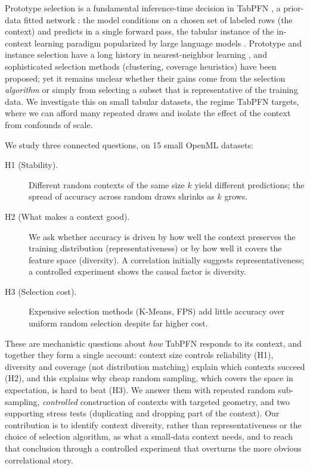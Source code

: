 \documentclass[11pt,a4paper]{article}
\begin{document}
Prototype selection is a fundamental inference-time decision in TabPFN
\cite{hollmann2025tabpfn}, a prior-data fitted network \cite{muller2022pfn}: the
model conditions on a chosen set of labeled rows (the context) and predicts in a
single forward pass, the tabular instance of the in-context learning paradigm
popularized by large language models \cite{brown2020gpt3, dong2024icl}. Prototype and instance selection have a long
history in nearest-neighbor learning \cite{garcia2012prototype}, and
sophisticated selection methods (clustering, coverage heuristics) have been
proposed; yet it remains unclear whether their gains come from the selection
\emph{algorithm} or simply from selecting a subset that is representative of the
training data. We investigate this on small tabular
datasets, the regime TabPFN targets, where we can afford many repeated draws
and isolate the effect of the context from confounds of scale.

We study three connected questions, on 15 small OpenML datasets:

\begin{description}
\item[H1 (Stability).] Different random contexts of the same size $k$ yield
different predictions; the spread of accuracy across random draws shrinks as $k$
grows.
\item[H2 (What makes a context good).] We ask whether accuracy is driven by how
well the context preserves the training distribution (representativeness) or by
how well it covers the feature space (diversity). A correlation initially
suggests representativeness; a controlled experiment shows the causal factor is
diversity.
\item[H3 (Selection cost).] Expensive selection methods (K-Means, FPS) add
little accuracy over uniform random selection despite far higher cost.
\end{description}

These are mechanistic questions about \emph{how} TabPFN responds to its context,
and together they form a single account: context size controls reliability (H1),
diversity and coverage (not distribution matching) explain which contexts succeed
(H2), and this explains why cheap random sampling, which covers the space in
expectation, is hard to beat (H3). We answer them with repeated random
sub-sampling, \emph{controlled} construction of contexts with targeted geometry,
and two supporting stress tests (duplicating and dropping part of the context).
Our contribution is to identify context diversity, rather than representativeness
or the choice of selection algorithm, as what a small-data context needs, and to
reach that conclusion through a controlled experiment that overturns the more
obvious correlational story.
\end{document}
